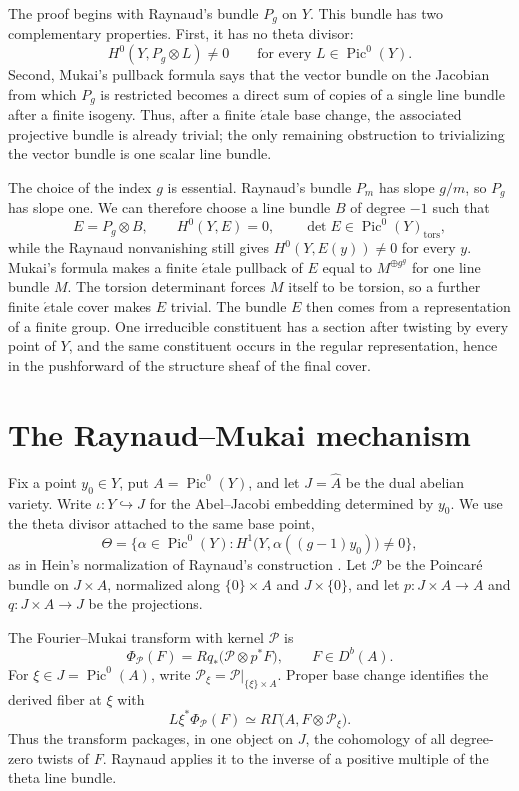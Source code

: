 \documentclass[a4paper]{amsart}
\theoremstyle{remark}
\DeclareMathOperator{\Pic}{Pic}
\newcommand{\tors}{\mathrm{tors}}
\begin{document}
The proof begins with Raynaud's bundle \(P_g\) on \(Y\).  This bundle has two complementary properties.  First, it has no theta divisor:
\[
 H^0(Y,P_g\otimes L)\neq 0
 \qquad\text{for every }L\in\Pic^0(Y).
\]
Second, Mukai's pullback formula says that the vector bundle on the Jacobian from which \(P_g\) is restricted becomes a direct sum of copies of a single line bundle after a finite isogeny.  Thus, after a finite \(\acute{e}\)tale base change, the associated projective bundle is already trivial; the only remaining obstruction to trivializing the vector bundle is one scalar line bundle.

The choice of the index \(g\) is essential.  Raynaud's bundle \(P_m\) has slope \(g/m\), so \(P_g\) has slope one.  We can therefore choose a line bundle \(B\) of degree \(-1\) such that
\[
 E=P_g\otimes B,\qquad H^0(Y,E)=0,\qquad
 \det E\in\Pic^0(Y)_{\tors},
\]
while the Raynaud nonvanishing still gives \(H^0(Y,E(y))\neq 0\) for every \(y\).  Mukai's formula makes a finite \(\acute{e}\)tale pullback of \(E\) equal to \(M^{\oplus g^g}\) for one line bundle \(M\).  The torsion determinant forces \(M\) itself to be torsion, so a further finite \(\acute{e}\)tale cover makes \(E\) trivial.  The bundle \(E\) then comes from a representation of a finite group.  One irreducible constituent has a section after twisting by every point of \(Y\), and the same constituent occurs in the regular representation, hence in the pushforward of the structure sheaf of the final cover.

\section{The Raynaud--Mukai mechanism}

Fix a point \(y_0\in Y\), put \(A=\Pic^0(Y)\), and let \(J=\widehat A\) be the dual abelian variety.  Write \(\iota:Y\hookrightarrow J\) for the Abel--Jacobi embedding determined by \(y_0\).  We use the theta divisor attached to the same base point,
\[
 \Theta=\bigl\{\alpha\in\Pic^0(Y):
 H^1\bigl(Y,\alpha((g-1)y_0)\bigr)\neq 0\bigr\},
\]
as in Hein's normalization of Raynaud's construction \cite[\S2.1]{Hein}.  Let \(\mathcal P\) be the Poincar\'e bundle on \(J\times A\), normalized along \(\{0\}\times A\) and \(J\times\{0\}\), and let
\(p:J\times A\to A\) and \(q:J\times A\to J\) be the projections.

The Fourier--Mukai transform with kernel \(\mathcal P\) is
\[
 \Phi_{\mathcal P}(F)=Rq_*\bigl(\mathcal P\otimes p^*F\bigr),
 \qquad F\in D^b(A).
\]
For \(\xi\in J=\Pic^0(A)\), write
\(\mathcal P_\xi=\mathcal P|_{\{\xi\}\times A}\).  Proper base change identifies the derived fiber at \(\xi\) with
\[
 L\xi^*\Phi_{\mathcal P}(F)
 \simeq R\Gamma\bigl(A,F\otimes\mathcal P_\xi\bigr).
\]
Thus the transform packages, in one object on \(J\), the cohomology of all degree-zero twists of \(F\).  Raynaud applies it to the inverse of a positive multiple of the theta line bundle.
\end{document}
